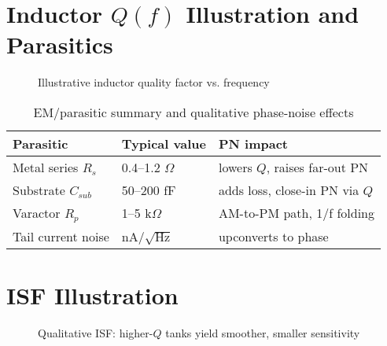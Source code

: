 \section{Inductor $Q(f)$ Illustration and Parasitics}
\begin{figure}[H]
  \centering
  \caption{Illustrative inductor quality factor vs. frequency}
\end{figure}

\begin{table}[H]
  \centering
  \begin{tabular}{lll}
    \toprule
    Parasitic & Typical value & PN impact \\
    \midrule
    Metal series $R_s$ & 0.4–1.2 $\Omega$ & lowers $Q$, raises far-out PN \\
    Substrate $C_{sub}$ & 50–200 fF & adds loss, close-in PN via $Q$ \\
    Varactor $R_p$ & 1–5 k$\Omega$ & AM-to-PM path, 1/f folding \\
    Tail current noise & nA/$\sqrt{\text{Hz}}$ & upconverts to phase \\
    \bottomrule
  \end{tabular}
  \caption{EM/parasitic summary and qualitative phase-noise effects}
\end{table}

\section{ISF Illustration}
\begin{figure}[H]
  \centering
  \caption{Qualitative ISF: higher-$Q$ tanks yield smoother, smaller sensitivity}
\end{figure}

